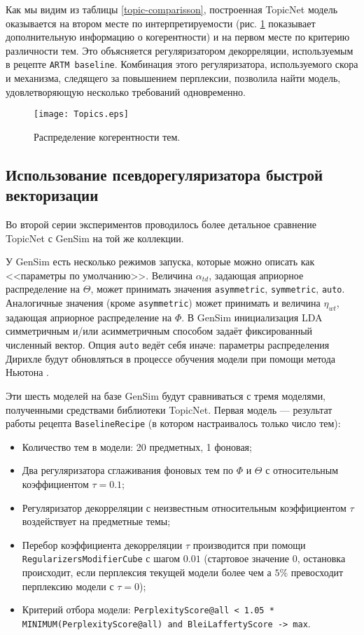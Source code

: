 Как мы видим из таблицы \ref{topic-comparisson}, построенная TopicNet модель  оказывается на втором месте по интерпретируемости (рис. \ref{topics_distribution} показывает дополнительную информацию о когерентности) и на первом месте по критерию различности тем. Это объясняется регуляризатором декорреляции, используемым в рецепте \texttt{ARTM baseline}. Комбинация этого регуляризатора, используемого скора и механизма, следящего за повышением перплексии, позволила найти модель, удовлетворяющую несколько требований одновременно.  

\begin{figure}[!ht]
    \centering
    \texttt{[image: Topics.eps]}
    \caption{Распределение когерентности тем.}
\label{topics_distribution}
\end{figure} 

\subsection{Использование псевдорегуляризатора быстрой векторизации} 

Во второй серии экспериментов проводилось более детальное сравнение TopicNet с GenSim на той же коллекции.  

У GenSim есть несколько режимов запуска, которые можно описать как <<параметры по умолчанию>>. Величина $\alpha_{td}$, задающая априорное распределение на $\Theta$, может принимать значения \texttt{asymmetric}, \texttt{symmetric}, \texttt{auto}. Аналогичные значения (кроме \texttt{asymmetric}) может принимать и величина $\eta_{wt}$, задающая априорное распределение на $\Phi$.  В GenSim инициализация LDA симметричным и/или асимметричным способом задаёт фиксированный численный вектор. Опция \texttt{auto} ведёт себя иначе: параметры распределения Дирихле будут обновляться в процессе обучения модели при помощи метода Ньютона \cite{huang2005maximum}.  

Эти шесть моделей на базе GenSim будут сравниваться с тремя моделями, полученными средствами библиотеки TopicNet. Первая модель --- результат работы рецепта \texttt{BaselineRecipe} (в котором настраивалось только число тем): 

\begin{itemize}
    \item Количество тем в модели: 20 предметных, 1 фоновая;
    \item Два регуляризатора сглаживания фоновых тем по $\Phi$ и $\Theta$ с относительным коэффициентом $\tau=0.1$;
    \item Регуляризатор декорреляции с неизвестным относительным коэффициентом $\tau$ воздействует на предметные темы;
    \item Перебор коэффициента декорреляции $\tau$ производится при помощи \texttt{RegularizersModifierCube} с шагом $0.01$ (стартовое значение $0$, остановка происходит, если перплексия текущей модели более чем а $5\%$ превосходит перплексию модели с $\tau=0$);
    \item Критерий отбора модели: \texttt{PerplexityScore@all < 1.05 * MINIMUM(PerplexityScore@all) and BleiLaffertyScore -> max}.
\end{itemize} 

